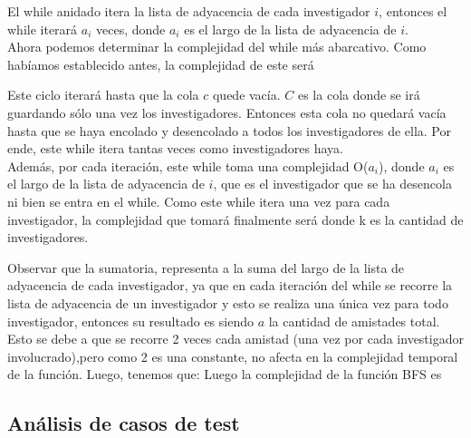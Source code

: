 \indent El while anidado itera la lista de adyacencia de cada investigador $i$,
entonces
el while iterará $a_i$ veces, donde $a_i$ es el largo
de la lista de adyacencia de $i$.\\

\indent Ahora podemos determinar la complejidad del while más abarcativo. Como
habíamos
establecido antes, la complejidad de este será 

\indent Este ciclo iterará hasta que la cola $c$ quede vacía. $C$ es la cola
donde se irá guardando
sólo una vez los investigadores. Entonces esta cola no quedará vacía hasta que
se haya encolado y desencolado 
a todos los investigadores de ella. Por ende, este while itera tantas veces como
investigadores haya.\\

\indent Además, por cada iteración, este while toma una complejidad O($a_i$),
donde $a_i$ es el largo
de la lista de adyacencia de $i$, que es el
investigador que se ha desencola ni bien se entra en el while. Como este while
itera una vez para cada investigador,
la complejidad que tomará finalmente será 
 donde k es la cantidad de investigadores.

\indent Observar que la sumatoria, representa a la suma del largo de la lista de
adyacencia de cada investigador, ya que en cada iteración del while se recorre
la lista de adyacencia de un investigador y esto se realiza una única vez para
todo investigador, entonces su resultado es 
siendo $a$ la cantidad de amistades total. Esto se debe a que se recorre 2 veces cada
amistad (una vez por cada investigador involucrado),pero como 2 es una
constante, no afecta
en la complejidad temporal de la función. Luego, tenemos que:
Luego la complejidad de la función BFS es 

\subsection{Análisis de casos de test}
